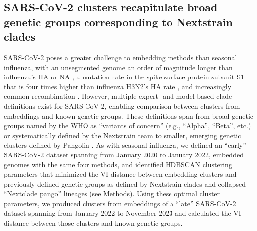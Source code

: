 \documentclass[10pt,letterpaper]{article}
\begin{document}
\subsection*{SARS-CoV-2 clusters recapitulate broad genetic groups corresponding to Nextstrain clades}

SARS-CoV-2 poses a greater challenge to embedding methods than seasonal influenza, with an unsegmented genome an order of magnitude longer than influenza's HA or NA \cite{Zhu2020}, a mutation rate in the spike surface protein subunit S1 that is four times higher than influenza H3N2's HA rate \cite{Kistler2022}, and increasingly common recombination \cite{Focosi2022,Turakhia2022}.
However, multiple expert- and model-based clade definitions exist for SARS-CoV-2, enabling comparison between clusters from embeddings and known genetic groups.
These definitions span from broad genetic groups named by the WHO as ``variants of concern'' (e.g., ``Alpha'', ``Beta'', etc.) \cite{Konings2021} or systematically defined by the Nextstrain team \cite{Hodcroft2020,Bedford2021,Roemer2022} to smaller, emerging genetic clusters defined by Pangolin \cite{OToole2021}.
As with seasonal influenza, we defined an ``early'' SARS-CoV-2 dataset spanning from January 2020 to January 2022, embedded genomes with the same four methods, and identified HDBSCAN clustering parameters that minimized the VI distance between embedding clusters and previously defined genetic groups as defined by Nextstrain clades and collapsed ``Nextclade pango'' lineages (see Methods).
Using these optimal cluster parameters, we produced clusters from embeddings of a ``late'' SARS-CoV-2 dataset spanning from January 2022 to November 2023 and calculated the VI distance between those clusters and known genetic groups.
\end{document}
